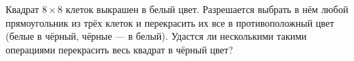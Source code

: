 Квадрат $8 \times 8$ клеток выкрашен в белый цвет. Разрешается выбрать в нём любой прямоугольник из трёх клеток и перекрасить их все в противоположный цвет (белые в чёрный, чёрные --- в белый). Удастся ли несколькими такими операциями перекрасить весь квадрат в чёрный цвет?